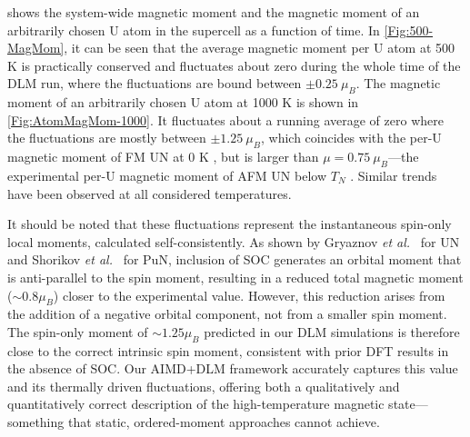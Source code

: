 \documentclass[preprint, 12pt]{elsarticle}
\newcommand{\?}{\stackrel{?}{=}}
\begin{document}
 shows the system-wide magnetic moment and the magnetic moment of an arbitrarily chosen U atom in the supercell as a function of time. In \cref{Fig:500-MagMom}, it can be seen that the average magnetic moment per U atom at 500 K is practically conserved and fluctuates about zero during the whole time of the DLM run, where the fluctuations are bound between $\pm 0.25 \ \mu_B$. The magnetic moment of an arbitrarily chosen U atom at 1000 K is shown in \cref{Fig:AtomMagMom-1000}. It fluctuates about a running average of zero where the fluctuations are mostly between $\pm 1.25 \ \mu_B$, which coincides with the per-U magnetic moment of FM UN at 0 K \cite{Kocevski2022I}, but is larger than $\mu = 0.75 \ \mu_B$---the experimental per-U magnetic moment of AFM UN below $T_N$ \cite{Curry1965}. Similar trends have been observed at all considered temperatures.

It should be noted that these fluctuations represent the instantaneous spin-only local moments, calculated self-consistently. As shown by Gryaznov \textit{et al.}~\cite{Gryaznov2012} for UN and Shorikov \textit{et al.}~\cite{Shorikov2005} for PuN, inclusion of SOC generates an orbital moment that is anti-parallel to the spin moment, resulting in a reduced total magnetic moment ($\sim 0.8 \mu_B$) closer to the experimental value. However, this reduction arises from the addition of a negative orbital component, not from a smaller spin moment. The spin-only moment of $\sim 1.25 \mu_B$ predicted in our DLM simulations is therefore close to the correct intrinsic spin moment, consistent with prior DFT results in the absence of SOC. Our AIMD+DLM framework accurately captures this value and its thermally driven fluctuations, offering both a qualitatively and quantitatively correct description of the high-temperature magnetic state---something that static, ordered-moment approaches cannot achieve. %
\end{document}
